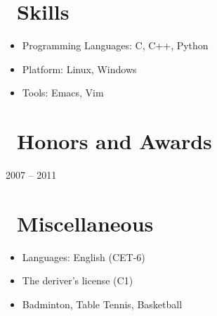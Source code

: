 \documentclass{resume}
\begin{document}

\section{\faCogs\ Skills}
\begin{itemize}[parsep=0.5ex]
  \item Programming Languages: C, C++, Python
  \item Platform: Linux, Windows
  \item Tools: Emacs, Vim
\end{itemize}

\section{\faHeartO\ Honors and Awards}
 {2007 -- 2011}

\section{\faInfo\ Miscellaneous}
\begin{itemize}[parsep=0.5ex]
  \item Languages: English (CET-6) 
  \item The deriver's license (C1)
  \item Badminton, Table Tennis, Basketball
\end{itemize}

%
%
\end{document}

